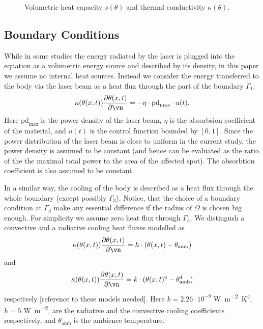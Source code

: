 \begin{figure}[ht]
	\centering
	
	
	\caption{Volumetric heat capacity $s(\theta)$ and thermal conductivity $\kappa(\theta)$.}
	\label{fig:coef}
\end{figure}



\subsection{Boundary Conditions}

While in some studies the energy radiated by the laser is plugged into the equation as a volumetric energy source and described by its density, in this paper we assume no internal heat sources.
Instead we consider the energy transferred to the body via the laser beam as a heat flux through the part of the boundary $\Gamma_1$:
\begin{equation}
	\kappa(\theta(x,t)) \frac{\partial \theta(x,t)}{\partial \vn} = - \eta \cdot \text{pd}_{\max} \cdot u(t).
\end{equation}
Here $\text{pd}_{\max}$ is the power density of the laser beam, $\eta$ is the absorbsion coefficient of the material, and $u(t)$ is the control function bounded by $[0,1]$.
Since the power distribution of the laser beam is close to uniform in the current study, the power density is assumed to be constant (and hence can be evaluated as the ratio of the the maximal total power to the area of the affected spot). The absorbtion coefficient is also assumed to be constant.

In a similar way, the cooling of the body is described as a heat flux through the whole boundary (except possibly $\Gamma_3$). Notice, that the choice of a boundary condition at $\Gamma_3$ make any essential difference if the radius of $\Omega$ is chosen big enough.
For simplicity we assume zero heat flux through $\Gamma_3$.
We distingush a convective and a radiative cooling heat fluxes modelled as
\begin{equation}
	\kappa(\theta(x,t)) \frac{\partial \theta(x,t)}{\partial \vn} = h \cdot (\theta(x,t) - \theta_\text{amb})
\end{equation}
and
\begin{equation}
	\kappa(\theta(x,t)) \frac{\partial \theta(x,t)}{\partial \vn} = k \cdot (\theta(x,t)^4 - \theta^4_\text{amb})
\end{equation}
respctively [reference to these models needed].
Here $k = 2.26 \cdot 10^{-9}$ \si{\W\per\m^2\K^4}, $h = 5$ \si{\W\per\m^2}, are the radiative and the convective cooling coefficients respectively, and $\theta_\text{amb}$ is the ambience temperature.

